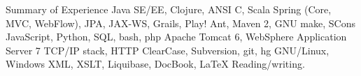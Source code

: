 \begin{rubric}{Summary of Experience}
   Java SE/EE, Clojure, ANSI C, Scala
  \entry*[Frameworks] Spring (Core, MVC, WebFlow), JPA, JAX-WS, Grails, Play!
   Ant, Maven 2, GNU make, SCons
  \entry*[Scripting] JavaScript, Python, SQL, bash, php
  \entry*[Servers] Apache Tomcat 6, WebSphere Application Server 7
  \entry*[Protocols] TCP/IP stack, HTTP
  \entry*[VCS] ClearCase, Subversion, git, hg
  \entry*[OS] GNU/Linux, Windows
  \entry*[Other] XML, XSLT, Liquibase, DocBook, \LaTeX
  \entry*[English] Reading/writing.
\end{rubric}
